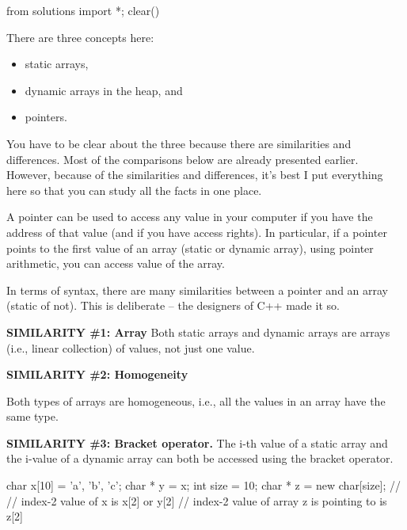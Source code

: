 \begin{python0}
from solutions import *; clear()
\end{python0}

There are three concepts here:

\begin{itemize}
\item static arrays,
\item dynamic arrays in the heap, and
\item pointers.
\end{itemize}

You have to be clear about the three because there are similarities and differences. Most of the comparisons below are already presented earlier. However, because of the similarities and differences, it's best I put everything here so that you can study all the facts in one place.

A pointer can be used to access any value in your computer if you have the address of that value (and if you have access rights). In particular, if a pointer points to the first value of an array (static or dynamic array), using pointer arithmetic, you can access value of the
array.

In terms of syntax, there are many similarities between a pointer and an array (static of not). This is deliberate -- the designers of C++ made it so.


\textbf{SIMILARITY \#1: Array}
Both static arrays and dynamic arrays are arrays (i.e., linear collection) of values, not just one value.

\textbf{SIMILARITY \#2: Homogeneity}                                           

Both types of arrays are homogeneous, i.e., all the values in an array have the same type.

\textbf{SIMILARITY \#3: Bracket operator.}
The i-th value of a static array and the i-value of a dynamic array can
both be accessed using the bracket operator.

\begin{consolethree}[escapeinside=||]
char x[10] = {'a', 'b', 'c'};
char * y = x;
int size = 10;
char * z = new char[size];
//
// index-2 value of x is x[2] or y[2]
// index-2 value of array z is pointing to is z[2]
\end{consolethree}

